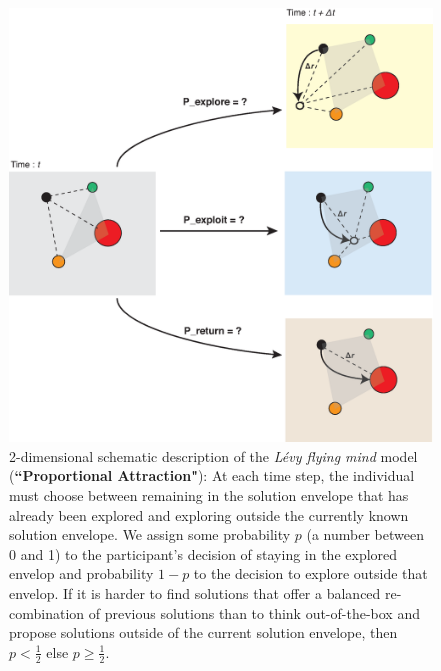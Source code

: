 \begin{figure}[h!]
\begin{center}
\includegraphics[width=12cm]{figures/schematic_displacement.eps}
\caption{2-dimensional schematic description of the {\it L\'evy flying mind} model ({\bf ``Proportional Attraction"}): At each time step, the individual must choose between remaining in the solution envelope that has already been explored and exploring outside the currently known solution envelope.  We assign some probability $p$ (a number between 0 and 1) to the participant's decision of staying in the explored envelop and probability $1-p$ to the decision to explore outside that envelop.  If it is harder to find solutions that offer a balanced re-combination of previous solutions than to think out-of-the-box and propose solutions outside of the current solution envelope, then $p < \frac{1}{2}$ else $p \geq \frac{1}{2}$.}
\label{fig:schematic}
\end{center}
\end{figure}




